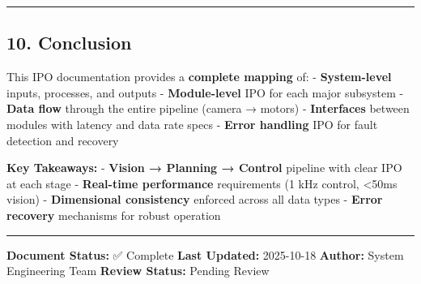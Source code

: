 \documentclass[
]{article}
\begin{document}
\begin{center}\rule{0.5\linewidth}{0.5pt}\end{center}

\hypertarget{conclusion}{%
\subsection{10. Conclusion}\label{conclusion}}

This IPO documentation provides a \textbf{complete mapping} of: -
\textbf{System-level} inputs, processes, and outputs -
\textbf{Module-level} IPO for each major subsystem - \textbf{Data flow}
through the entire pipeline (camera → motors) - \textbf{Interfaces}
between modules with latency and data rate specs - \textbf{Error
handling} IPO for fault detection and recovery

\textbf{Key Takeaways:} - \textbf{Vision → Planning → Control} pipeline
with clear IPO at each stage - \textbf{Real-time performance}
requirements (1 kHz control, \textless50ms vision) - \textbf{Dimensional
consistency} enforced across all data types - \textbf{Error recovery}
mechanisms for robust operation

\begin{center}\rule{0.5\linewidth}{0.5pt}\end{center}

\textbf{Document Status:} ✅ Complete \textbf{Last Updated:} 2025-10-18
\textbf{Author:} System Engineering Team \textbf{Review Status:} Pending
Review
\end{document}
